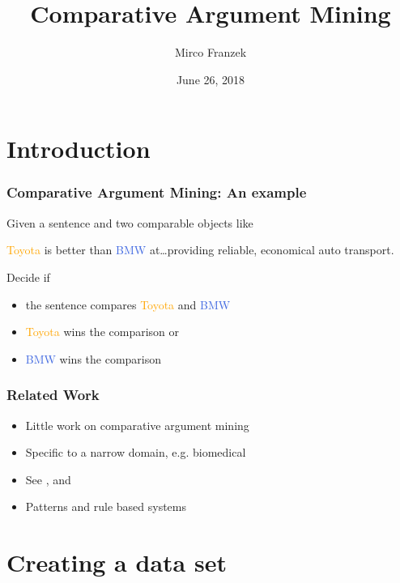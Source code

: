 \documentclass[11pt,aspectratio=169,usenames,dvipsnames]{beamer}
\title{Comparative Argument Mining}
\author{Mirco Franzek}
\date{June 26, 2018}
\begin{document}
    \maketitle

    \section{Introduction}
    \frame{\sectionpage}

    \begin{frame}[t]
        \frametitle{Comparative Argument Mining: An example}
        Given a sentence and two comparable objects like

        \begin{center}
            \LARGE \textcolor{orange}{Toyota} is better than \textcolor{RoyalBlue}{BMW} at\ldots providing reliable, economical auto transport.
        \end{center}
        \pause
        Decide if
        \begin{itemize}
            \item the sentence compares \textcolor{orange}{Toyota} and \textcolor{RoyalBlue}{BMW}   \pause
            \item \textcolor{orange}{Toyota} wins the comparison or   \pause
            \item \textcolor{RoyalBlue}{BMW} wins the comparison
        \end{itemize}

    \end{frame}

    \begin{frame}[t]
        \frametitle{Related Work}
        \begin{itemize}
            \item Little work on comparative argument mining
            \item Specific to a narrow domain, e.g. biomedical
            \item See \cite{fiszman2007interpreting}, \cite{Park:2012:ICC:2391171.2391173} and \cite{gupta2017identifying}
            \item Patterns and rule based systems
        \end{itemize}

    \end{frame}


    \section{Creating a data set}
    \frame{\sectionpage}
\end{document}
